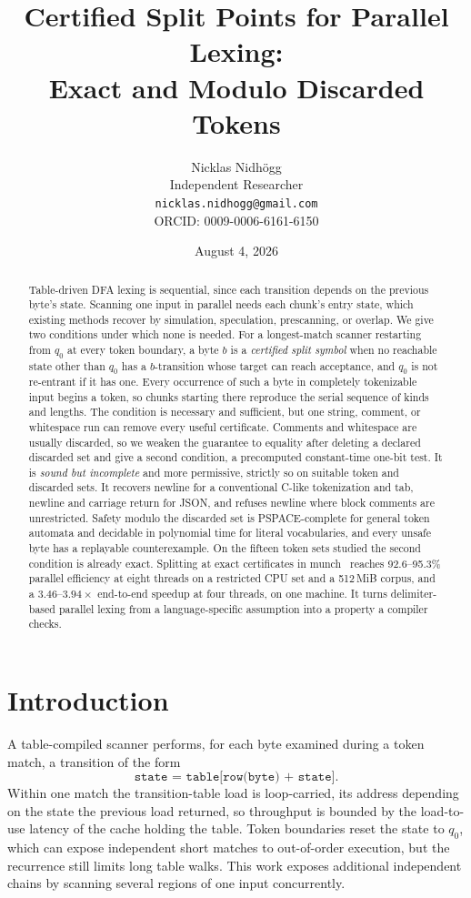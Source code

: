 \documentclass[11pt,a4paper]{article}
\title{Certified Split Points for Parallel Lexing:\\Exact and Modulo Discarded Tokens}
\author{Nicklas Nidh\"ogg\\[0.4em] \normalsize Independent Researcher\\ \normalsize
\texttt{nicklas.nidhogg@gmail.com}\\ \normalsize ORCID: 0009-0006-6161-6150}
\date{August 4, 2026}
\theoremstyle{definition}
\theoremstyle{plain}
\newcommand{\code}[1]{\texttt{#1}}
\begin{document}
\maketitle

\begin{abstract}
Table-driven DFA lexing is sequential, since each transition depends on the previous byte's state. Scanning one input in
parallel needs each chunk's entry state, which existing methods recover by simulation, speculation, prescanning, or
overlap. We give two conditions under which none is needed. For a longest-match scanner restarting from $q_0$ at every
token boundary, a byte $b$ is a \emph{certified split symbol} when no reachable state other than $q_0$ has a
$b$-transition whose target can reach acceptance, and $q_0$ is not re-entrant if it has one. Every occurrence of such a
byte in completely tokenizable input begins a token, so chunks starting there reproduce the serial sequence of kinds and
lengths. The condition is necessary and sufficient, but one string, comment, or whitespace run can remove every useful
certificate. Comments and whitespace are usually discarded, so we weaken the guarantee to equality after deleting a
declared discarded set and give a second condition, a precomputed constant-time one-bit test. It is
\emph{sound but incomplete} and more permissive, strictly so on suitable token and discarded sets. It recovers newline
for a conventional C-like tokenization and tab, newline and carriage return for JSON, and refuses newline where block
comments are unrestricted. Safety modulo the discarded set is PSPACE-complete for general token automata and decidable
in polynomial time for literal vocabularies, and every unsafe byte has a replayable counterexample. On the fifteen token
sets studied the second condition is already exact. Splitting at exact certificates in munch~\cite{munch} reaches
92.6--95.3\%
parallel efficiency at eight threads on a restricted CPU set and a 512\,MiB corpus, and a $3.46$--$3.94\times$
end-to-end speedup at four threads, on one machine. It turns delimiter-based parallel lexing from a language-specific
assumption into a property a compiler checks.
\end{abstract}

\section{Introduction}

A table-compiled scanner performs, for each byte examined during a token match, a transition of the form \[
\code{state = table[row(byte) + state]}. \] Within one match the transition-table load is loop-carried, its address
depending on the state the previous load returned, so throughput is bounded by the load-to-use latency of the cache
holding the table. Token boundaries reset the state to $q_0$, which can expose independent short matches to out-of-order
execution, but the recurrence still limits long table walks. This work exposes additional independent chains by scanning
several regions of one input concurrently.
\end{document}
